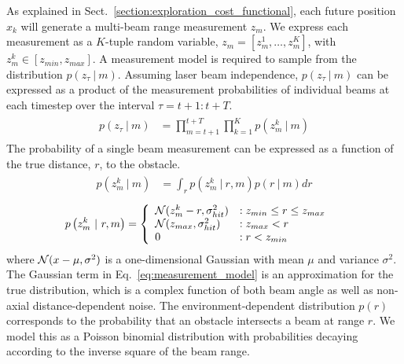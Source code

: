 \documentclass{article}
\begin{document}
As explained in Sect.~\ref{section:exploration_cost_functional}, each future position $x_{k}$ will generate a multi-beam range measurement $z_{m}$. We express each measurement as a $K$-tuple random variable, $z_{m} = \left[z_{m}^{1}, \dots, z_{m}^{K}\right]$, with $z_{m}^{k} \in \left[z_{min}, z_{max}\right]$. A measurement model is required to sample from the distribution $p(z_{\tau} \ \vert \ m)$. Assuming laser beam independence, $p(z_{\tau} \ \vert \ m)$ can be expressed as a product of the measurement probabilities of individual beams at each timestep over the interval $\tau = t+1:t+T$.
%
\begin{align}
  \begin{split}
    p
    \left(
    z_{\tau}
    \ \vert \
    m
    \right)
    &=
    \prod_{m=t+1}^{t+T}
    \prod_{k=1}^{K}
    p
    \left(
    z_{m}^{k}
    \ \vert \
    m
    \right)
  \end{split}
\end{align}
%
The probability of a single beam measurement can be expressed as a function of the true distance, $r$, to the obstacle.
%
\begin{align}
  \begin{split}
    p
    \left(
    z_{m}^{k}
    \ \vert \
    m
    \right)
    &=
    \int_{r}
    p
    \left(
    z_{m}^{k}
    \ \vert \
    r
    ,
    m
    \right)
    p
    \left(
    r
    \ \vert \
    m
    \right)
    dr
  \end{split}
\end{align}
%
\begin{align}
  \begin{split}
    p
    \left(
    z_{m}^{k}
    \ \vert \
    r
    ,
    m
    \right)
    &=
    \left\{
    \begin{array}{ll}
      \mathcal{N}(z_{m}^{k} - r, \sigma_{hit}^{2}) &: z_{min} \le r \le z_{max} \\
            \mathcal{N}(z_{max}, \sigma_{hit}^{2}) &: z_{max} < r \\
                                            0 &: r < z_{min}
    \end{array}
    \right.
    \label{eq:measurement_model}
  \end{split}
\end{align}
%
where $\mathcal{N}(x - \mu, \sigma^{2})$ is a one-dimensional Gaussian with mean $\mu$ and variance $\sigma^{2}$. The Gaussian term in Eq.~\eqref{eq:measurement_model} is an approximation for the true distribution, which is a complex function of both beam angle as well as non-axial distance-dependent noise. The environment-dependent distribution $p(r)$ corresponds to the probability that an obstacle intersects a beam at range $r$. We model this as a Poisson binomial distribution with probabilities decaying according to the inverse square of the beam range.
\end{document}

